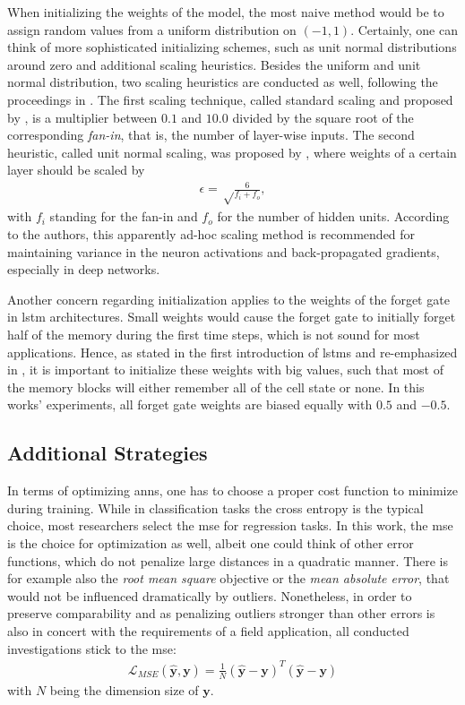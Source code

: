 When initializing the weights of the model, the most naive method would be to assign random values from a uniform distribution on $({-1}, 1)$.
Certainly, one can think of more sophisticated initializing schemes, such as unit normal distributions around zero and additional scaling heuristics.
Besides the uniform and unit normal distribution, two scaling heuristics are conducted as well, following the proceedings in \cite{BeBe2012}.
The first scaling technique, called standard scaling and proposed by \cite{LeBo1998}, is a multiplier between $0.1$ and $10.0$ divided by the square root of the corresponding \textit{fan-in}, that is, the number of layer-wise inputs.
The second heuristic, called unit normal scaling, was proposed by \cite{GloBe2010}, where weights of a certain layer should be scaled by 
\begin{align}
	\epsilon = \sqrt\frac{6}{f_i + f_o},
\end{align}
with $f_i$ standing for the fan-in and $f_o$ for the number of hidden units.
According to the authors, this apparently ad-hoc scaling method is recommended for maintaining variance in the neuron activations and back-propagated gradients, especially in deep networks.

Another concern regarding initialization applies to the weights of the forget gate in \gls{lstm} architectures.
Small weights would cause the forget gate to initially forget half of the memory during the first time steps, which is not sound for most applications.
Hence, as stated in the first introduction of \glspl{lstm} and re-emphasized in \cite{JoZa2015}, it is important to initialize these weights with big values, such that most of the memory blocks will either remember all of the cell state or none.
In this works' experiments, all forget gate weights are biased equally with $0.5$ and ${-0.5}$.

\subsection{Additional Strategies}
\label{ssec:add_strats}
In terms of optimizing \glspl{ann}, one has to choose a proper cost function to minimize during training.
While in classification tasks the cross entropy is the typical choice, most researchers select the \gls{mse} for regression tasks.
In this work, the \gls{mse} is the choice for optimization as well, albeit one could think of other error functions, which do not penalize large distances in a quadratic manner.
There is for example also the \textit{root mean square} objective or the \textit{mean absolute error}, that would not be influenced dramatically by outliers.
Nonetheless, in order to preserve comparability and as penalizing outliers stronger than other errors is also in concert with the requirements of a field application, all conducted investigations stick to the \gls{mse}:
\begin{align}
	\mathcal L_{MSE}(\bm{\hat y}, \bm y) = \frac{1}{N}(\bm{\hat y}  - \bm{ y})^T(\bm{\hat y}  - \bm{ y})
\end{align}
with $N$ being the dimension size of $\bm y$.

